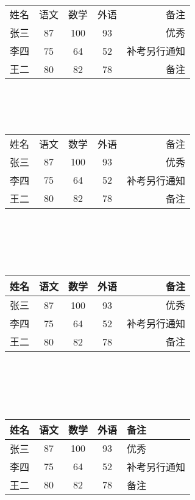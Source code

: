 \documentclass{ctexart}
\begin{document}
	\begin{tabular}{l c c c r}
	姓名 & 语文 & 数学 & 外语 & 备注 \\
	张三 & 87 & 100 & 93 & 优秀 \\
	李四 & 75 & 64 & 52 & 补考另行通知  \\
	王二 & 80 & 82 & 78 & 备注 \\

	\end{tabular}
\\
\\
\\

	\begin{tabular}{l | c | c | c | r}
	姓名 & 语文 & 数学 & 外语 & 备注 \\
	张三 & 87 & 100 & 93 & 优秀 \\
	李四 & 75 & 64 & 52 & 补考另行通知  \\
	王二 & 80 & 82 & 78 & 备注 \\ 
	\end{tabular}
\\
	\\
	\\
	\\
	
	\begin{tabular}{l | c | c | c | r}
		姓名 & 语文 & 数学 & 外语 & 备注 \\
		\hline\hline
		张三 & 87 & 100 & 93 & 优秀 \\
		\hline
		李四 & 75 & 64 & 52 & 补考另行通知  \\
		\hline
		王二 & 80 & 82 & 78 & 备注 \\
		\hline
		\end{tabular}
	\\
	\\
	\\
	\\
	
	\begin{tabular}{|l ||c | c | c | p{1.5cm}|}
		姓名 & 语文 & 数学 & 外语 & 备注 \\
		\hline\hline
		张三 & 87 & 100 & 93 & 优秀 \\
		\hline
		李四 & 75 & 64 & 52 & 补考另行通知  \\
		\hline
		王二 & 80 & 82 & 78 & 备注 \\
		\hline
	\end{tabular}
	

	
\end{document}
